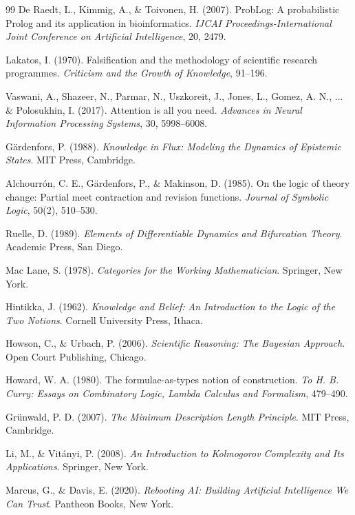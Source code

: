 \documentclass[11pt, a4paper]{article}
\begin{document}
\begin{thebibliography}{99}
	De Raedt, L., Kimmig, A., \& Toivonen, H. (2007). 
	ProbLog: A probabilistic Prolog and its application in bioinformatics. 
	\emph{IJCAI Proceedings-International Joint Conference on Artificial Intelligence}, 20, 2479.
	
	Lakatos, I. (1970). 
	Falsification and the methodology of scientific research programmes. 
	\emph{Criticism and the Growth of Knowledge}, 91--196.
	
	Vaswani, A., Shazeer, N., Parmar, N., Uszkoreit, J., Jones, L., Gomez, A. N., ... \& Polosukhin, I. (2017). 
	Attention is all you need. 
	\emph{Advances in Neural Information Processing Systems}, 30, 5998--6008.
	
	Gärdenfors, P. (1988). 
	\emph{Knowledge in Flux: Modeling the Dynamics of Epistemic States}. 
	MIT Press, Cambridge.
	
	Alchourrón, C. E., Gärdenfors, P., \& Makinson, D. (1985). 
	On the logic of theory change: Partial meet contraction and revision functions. 
	\emph{Journal of Symbolic Logic}, 50(2), 510--530.
	
	Ruelle, D. (1989). 
	\emph{Elements of Differentiable Dynamics and Bifurcation Theory}. 
	Academic Press, San Diego.
	
	Mac Lane, S. (1978). 
	\emph{Categories for the Working Mathematician}. 
	Springer, New York.
	
	Hintikka, J. (1962). 
	\emph{Knowledge and Belief: An Introduction to the Logic of the Two Notions}. 
	Cornell University Press, Ithaca.
	
	Howson, C., \& Urbach, P. (2006). 
	\emph{Scientific Reasoning: The Bayesian Approach}. 
	Open Court Publishing, Chicago.
	
	Howard, W. A. (1980). 
	The formulae-as-types notion of construction. 
	\emph{To H. B. Curry: Essays on Combinatory Logic, Lambda Calculus and Formalism}, 479--490.
	
	Grünwald, P. D. (2007). 
	\emph{The Minimum Description Length Principle}. 
	MIT Press, Cambridge.
	
	Li, M., \& Vitányi, P. (2008). 
	\emph{An Introduction to Kolmogorov Complexity and Its Applications}. 
	Springer, New York.
	
	Marcus, G., \& Davis, E. (2020). 
	\emph{Rebooting AI: Building Artificial Intelligence We Can Trust}. 
	Pantheon Books, New York.
	

\end{thebibliography}
\end{document}
